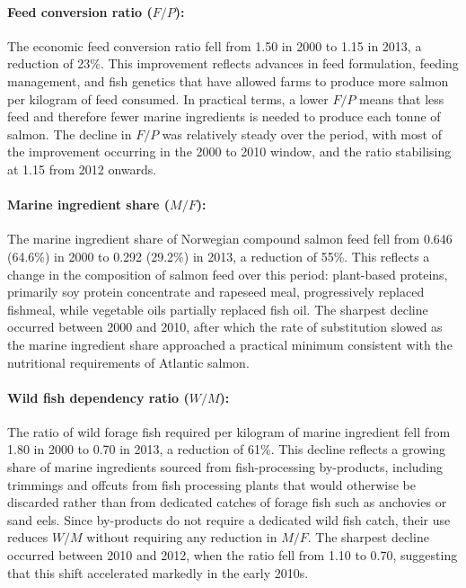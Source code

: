 \documentclass[12pt, a4paper]{report}
\begin{document}
\paragraph{Feed conversion ratio ($F/P$):}
The economic feed conversion ratio fell from 1.50 in 2000 to 1.15 in
2013, a reduction of 23\%. This improvement reflects advances in feed
formulation, feeding management, and fish genetics that have allowed
farms to produce more salmon per kilogram of feed consumed. In practical
terms, a lower $F/P$ means that less feed and therefore fewer marine
ingredients is needed to produce each tonne of salmon. The decline
in $F/P$ was relatively steady over the period, with most of the
improvement occurring in the 2000 to 2010 window, and the ratio
stabilising at 1.15 from 2012 onwards.

\paragraph{Marine ingredient share ($M/F$):}
The marine ingredient share of Norwegian compound salmon feed fell from
0.646 (64.6\%) in 2000 to 0.292 (29.2\%) in 2013, a reduction of 55\%.
This reflects a change in the composition of salmon feed
over this period: plant-based proteins, primarily soy protein
concentrate and rapeseed meal, progressively replaced fishmeal,
while vegetable oils partially replaced fish oil. The sharpest decline
occurred between 2000 and 2010, after which the rate of substitution
slowed as the marine ingredient share approached a practical minimum
consistent with the nutritional requirements of Atlantic salmon.

\paragraph{Wild fish dependency ratio ($W/M$):}
The ratio of wild forage fish required per kilogram of marine ingredient
fell from 1.80 in 2000 to 0.70 in 2013, a reduction of 61\%.
This decline reflects a growing share of marine ingredients sourced
from fish-processing by-products, including trimmings and offcuts from fish
processing plants that would otherwise be discarded rather than
from dedicated catches of forage fish such as anchovies or sand eels.
Since by-products do not require a dedicated wild fish catch, their
use reduces $W/M$ without requiring any reduction in $M/F$. The
sharpest decline occurred between 2010 and 2012, when the ratio fell
from 1.10 to 0.70, suggesting that this shift accelerated markedly
in the early 2010s.
\end{document}
